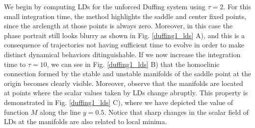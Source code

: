 \documentclass[8pt]{article}
\begin{document}
We begin by computing LDs for the unforced Duffing system using $\tau = 2$. For this small integration time, the method highlights the saddle and center fixed points, since the arclength at those points is always zero. Moreover, in this case the phase portrait still looks blurry as shown in Fig. \ref{duffing1_lds} A), and this is a consequence of trajectories not having sufficient time to evolve in order to make distinct dynamical behaviors ditinguishable. If we now increase the integration time to $\tau = 10$, we can see in Fig. \ref{duffing1_lds} B) that the homoclinic connection formed by the stable and unstable manifolds of the saddle point at the origin becomes clearly visible. Moreover, observe that the manifolds are located at points where the scalar values taken by LDs change abruptly. This property is demonstrated in Fig. \ref{duffing1_lds} C), where we have depicted the value of function $M$ along the line $y = 0.5$. Notice that sharp changes in the scalar field of LDs at the manifolds are also related to local minima.
\end{document}
